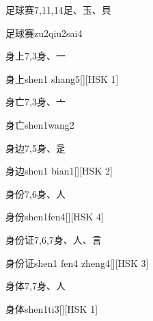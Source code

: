 \begin{entry}{足球赛}{7,11,14}{⾜、⽟、⾙}
  \begin{phonetics}{足球赛}{zu2qiu2sai4}
  \end{phonetics}
\end{entry}

\begin{entry}{身上}{7,3}{⾝、⼀}
  \begin{phonetics}{身上}{shen1 shang5}[][HSK 1]
  \end{phonetics}
\end{entry}

\begin{entry}{身亡}{7,3}{⾝、⼇}
  \begin{phonetics}{身亡}{shen1wang2}
  \end{phonetics}
\end{entry}

\begin{entry}{身边}{7,5}{⾝、⾡}
  \begin{phonetics}{身边}{shen1 bian1}[][HSK 2]
  \end{phonetics}
\end{entry}

\begin{entry}{身份}{7,6}{⾝、⼈}
  \begin{phonetics}{身份}{shen1fen4}[][HSK 4]
  \end{phonetics}
\end{entry}

\begin{entry}{身份证}{7,6,7}{⾝、⼈、⾔}
  \begin{phonetics}{身份证}{shen1 fen4 zheng4}[][HSK 3]
  \end{phonetics}
\end{entry}

\begin{entry}{身体}{7,7}{⾝、⼈}
  \begin{phonetics}{身体}{shen1ti3}[][HSK 1]
  \end{phonetics}
\end{entry}

